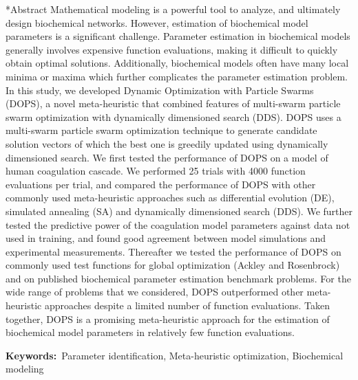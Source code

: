 \documentclass[12pt]{article}
\makeatletter
\renewcommand\section{\@startsection
	{subsection}{2}{0mm}
	{-0.2in}
	{0.05\baselineskip}
	{\normalfont\large\bfseries}}
\makeatother
\begin{document}
\section*{Abstract}
Mathematical modeling is a powerful tool to analyze, and ultimately design biochemical networks. However, estimation of biochemical model parameters is a significant challenge. Parameter estimation in biochemical models generally involves expensive function evaluations, making it difficult to quickly obtain optimal solutions. Additionally, biochemical models often have many local minima or maxima which further complicates the parameter estimation problem. In this study, we developed Dynamic Optimization with Particle Swarms (DOPS), a novel meta-heuristic that combined features of multi-swarm particle swarm optimization with dynamically dimensioned search (DDS). DOPS uses a multi-swarm particle swarm optimization technique to generate candidate solution vectors of which the best one is greedily updated using dynamically dimensioned search. We first tested the performance of DOPS on a model of human coagulation cascade. We performed 25 trials with 4000 function evaluations per trial, and compared the performance of DOPS with other commonly
used meta-heuristic approaches such as differential evolution (DE), simulated annealing (SA) and dynamically dimensioned search (DDS). We further tested the predictive power of the coagulation model parameters against data not used in training, and found good agreement between model simulations and experimental measurements. Thereafter we tested the performance of DOPS on commonly used test functions for global optimization (Ackley and Rosenbrock) and on published biochemical parameter estimation benchmark problems.  For the wide range of problems that we considered, DOPS outperformed other meta-heuristic approaches despite a limited number of function evaluations. Taken together, DOPS is a promising meta-heuristic approach for the estimation of biochemical model parameters in relatively few function evaluations.

{\noindent \textbf{Keywords:}~Parameter identification, Meta-heuristic optimization, Biochemical modeling}

\end{document}
